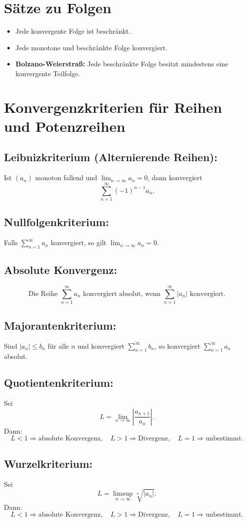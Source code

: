 \documentclass[12pt]{article}
\begin{document}
\section{Sätze zu Folgen}
\begin{itemize}
  \item Jede konvergente Folge ist beschränkt.
  \item Jede monotone und beschränkte Folge konvergiert.
  \item \textbf{Bolzano-Weierstraß:} Jede beschränkte Folge besitzt mindestens eine konvergente Teilfolge.
\end{itemize}

\section{Konvergenzkriterien für Reihen und Potenzreihen}
\subsection*{Leibnizkriterium (Alternierende Reihen):}
Ist \( (a_n) \) monoton fallend und \( \lim_{n\to\infty} a_n = 0 \), dann konvergiert
\[
\sum_{n=1}^\infty (-1)^{n-1} a_n.
\]
\subsection*{Nullfolgenkriterium:}
Falls \( \sum_{n=1}^\infty a_n \) konvergiert, so gilt \( \lim_{n\to\infty} a_n = 0 \).
\subsection*{Absolute Konvergenz:}
\[
\text{Die Reihe } \sum_{n=1}^\infty a_n \text{ konvergiert absolut, wenn } \sum_{n=1}^\infty |a_n| \text{ konvergiert.}
\]
\subsection*{Majorantenkriterium:}
Sind \( |a_n| \le b_n \) für alle \( n \) und konvergiert \( \sum_{n=1}^\infty b_n \), so konvergiert \( \sum_{n=1}^\infty a_n \) absolut.
\subsection*{Quotientenkriterium:}
Sei
\[
L = \lim_{n\to\infty} \left|\frac{a_{n+1}}{a_n}\right|.
\]
Dann:
\[
L < 1 \Rightarrow \text{absolute Konvergenz}, \quad L > 1 \Rightarrow \text{Divergenz}, \quad L = 1 \Rightarrow \text{unbestimmt.}
\]
\subsection*{Wurzelkriterium:}
Sei
\[
L = \limsup_{n\to\infty} \sqrt[n]{|a_n|}.
\]
Dann:
\[
L < 1 \Rightarrow \text{absolute Konvergenz}, \quad L > 1 \Rightarrow \text{Divergenz}, \quad L = 1 \Rightarrow \text{unbestimmt.}
\]
\end{document}
